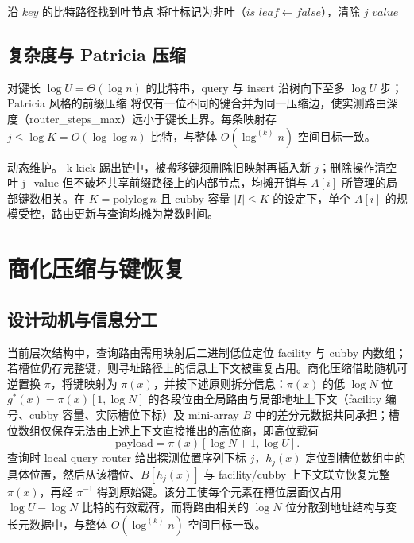 \begin{algorithm}[htbp]
  \caption{local query router.delete}
  \label{alg:lqr-delete}
  \begin{algorithmic}[1]
      \State 沿 $\mathit{key}$ 的比特路径找到叶节点
      \State 将叶标记为非叶（$\mathit{is\_leaf}\gets\mathit{false}$），清除 $\mathit{j\_value}$
    \EndFunction
  \end{algorithmic}
\end{algorithm}

\subsection{复杂度与 Patricia 压缩}

对键长 \(\log U=\Theta(\log n)\) 的比特串，query 与 insert 沿树向下至多 \(\log U\) 步；Patricia 风格的前缀压缩\cite{morrison1968,pagh2008retrieval,lehmann2025combined} 将仅有一位不同的键合并为同一压缩边，使实测路由深度（router\_steps\_max）远小于键长上界。每条映射存 \(j\le\log K=O(\log\log n)\) 比特，与整体 \(O(\log^{(k)}n)\) 空间目标一致\cite{bender2022otsh,kuszmaul2024filters}。

动态维护。 k-kick 踢出链中，被搬移键须删除旧映射再插入新 \(j\)；删除操作清空叶 j\_value 但不破坏共享前缀路径上的内部节点，均摊开销与 \(A[i]\) 所管理的局部键数相关。在 \(K=\mathrm{polylog}\,n\) 且 cubby 容量 \(|I|\le K\) 的设定下，单个 \(A[i]\) 的规模受控，路由更新与查询均摊为常数时间\cite{bender2022otsh,bender2024sosa}。

\section{商化压缩与键恢复}

\subsection{设计动机与信息分工}

当前层次结构中，查询路由需用映射后二进制低位定位 facility 与 cubby 内数组；若槽位仍存完整键，则寻址路径上的信息上下文被重复占用。商化压缩借助随机可逆置换 \(\pi\)，将键映射为 \(\pi(x)\)，并按下述原则拆分信息：\(\pi(x)\) 的低 \(\log N\) 位 \(g^\ast(x)=\pi(x)[1,\log N]\) 的各段位由全局路由与局部地址上下文（facility 编号、cubby 容量、实际槽位下标）及 mini-array \(B\) 中的差分元数据共同承担；槽位数组仅保存无法由上述上下文直接推出的高位商，即高位载荷
\begin{equation}
  \mathrm{payload}=\pi(x)[\log N+1,\log U].
\end{equation}
查询时 local query router 给出探测位置序列下标 \(j\)，\(h_j(x)\) 定位到槽位数组中的具体位置，然后从该槽位、\(B[h_j(x)]\) 与 facility/cubby 上下文联立恢复完整 \(\pi(x)\)，再经 \(\pi^{-1}\) 得到原始键。该分工使每个元素在槽位层面仅占用 \(\log U-\log N\) 比特的有效载荷，而将路由相关的 \(\log N\) 位分散到地址结构与变长元数据中，与整体 \(O(\log^{(k)}n)\) 空间目标一致\cite{bender2022otsh,pagh2008retrieval}。

